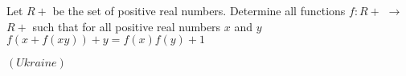 Let $R+$ be the set of positive real numbers. Determine all functions $f:R+$ $\rightarrow$ $R+$ such that for all positive real numbers $x$ and $y$
$f(x+f(xy))+y=f(x)f(y)+1$

$(Ukraine)$